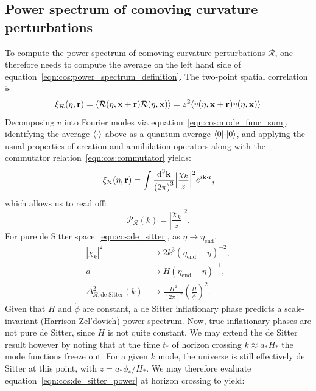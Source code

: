 \subsection{Power spectrum of comoving curvature perturbations}
To compute the power spectrum of comoving curvature perturbations \(\mathcal{R}\), one therefore needs to compute the average on the left hand side of equation~\eqref{eqn:cos:power_spectrum_definition}. The two-point spatial correlation is:
\begin{equation}
  \xi_\mathcal{R}(\eta,\vr) = \mean{\mathcal{R}(\eta,\vx+\vr)\mathcal{R}(\eta,\vx)} = z^2\mean{v(\eta,\vx+\vr)v(\eta,\vx)}
\end{equation}
Decomposing \(v\) into Fourier modes via equation~\eqref{eqn:cos:mode_func_sum}, identifying the average \(\mean{\cdot}\) above as a quantum average \(\bracket{0}{\cdot}{0}\), and applying the usual properties of creation and annihilation operators along with the commutator relation~\eqref{eqn:cos:commutator} yields:
\begin{equation}
  \xi_\mathcal{R}(\eta,\vr) = \int \frac{\d[3]{\vk}}{{(2\pi)}^3} {\left|\frac{\chi_k}{z}\right|}^2 e^{i\vk\cdot\vr}, 
\end{equation}
which allows us to read off:
\begin{equation}
  \mathcal{P}_\mathcal{R}(k) = {\left|\frac{\chi_k}{z}\right|}^2.
\end{equation}
For pure de Sitter space~\eqref{eqn:cos:de_sitter}, as \(\eta\to\eta_\mathrm{end}\),
\begin{align}
  |\chi_k|^2 &\rightarrow 2k^3 {(\eta_\mathrm{end}-\eta)}^{-2},\nonumber\\
  a& \rightarrow H{(\eta_\mathrm{end}-\eta)}^{-1}, \nonumber\\
  \Delta_{\mathcal{R},\text{de Sitter}}^2(k) &\rightarrow \frac{H^2}{{(2\pi)}^2}{\left( \frac{H}{\dot{\phi}} \right)}^2.
  \label{eqn:cos:de_sitter_power}
\end{align}
Given that \(H\) and \(\dot{\phi}\) are constant, a de Sitter inflationary phase predicts a scale-invariant (Harrison-Zel'dovich) power spectrum. Now, true inflationary phases are not pure de Sitter, since \(H\) is not quite constant. We may extend the de Sitter result however by noting that at the time \(t_*\) of horizon crossing  \(k\approx a_*H_*\) the mode functions freeze out. For a given \(k\) mode, the universe is still effectively de Sitter at this point, with \(z=a_*\dot{\phi}_*/H_*\). We may therefore evaluate equation~\eqref{eqn:cos:de_sitter_power} at horizon crossing to yield:
